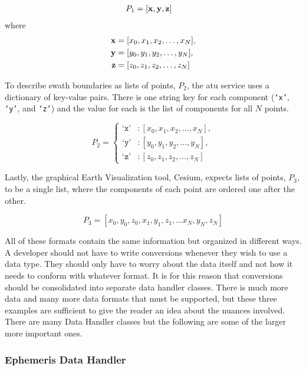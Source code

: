 \begin{align*}
    P_1 &= [\bm{\mathrm{x}}, \bm{\mathrm{y}}, \bm{\mathrm{z}}] 
\end{align*}
where
\begin{align*}
    \bm{\mathrm{x}} &= [x_0, x_1, x_2, \ldots, x_N],  \\
    \bm{\mathrm{y}} &= [y_0, y_1, y_2, \ldots, y_N],  \\
    \bm{\mathrm{z}} &= [z_0, z_1, z_2, \ldots, z_N]
\end{align*}

To describe swath boundaries as lists of points, $P_2$, the \gls{atu} service
uses a dictionary of key-value pairs. There is one string key for each
component (\texttt{`x'}, \texttt{`y'}, and \texttt{`z'}) and the value for each
is the list of components for all $N$ points. 

\begin{equation*}
    P_2 = 
    \left\{
    \begin{aligned}
	\texttt{`x'}&: [x_0, x_1, x_2, \ldots, x_N],  \\
	\texttt{`y'}&: [y_0, y_1, y_2, \ldots, y_N],  \\
	\texttt{`z'}&: [z_0, z_1, z_2, \ldots, z_N]
    \end{aligned}
    \right.
\end{equation*}

Lastly, the graphical Earth Visualization tool, Cesium, expects lists of
points, $P_3$, to be a single list, where the components of each point are
ordered one after the other.

\begin{equation*}
    P_3 = \left[ x_0, y_0, z_0, x_1, y_1, z_1, \ldots x_N, y_N, z_N \right]
\end{equation*}

All of these formats contain the same information but organized in different
ways.  A developer should not have to write conversions whenever they wish to
use a data type.  They should only have to worry about the data itself and not
how it needs to conform with whatever format. It is for this reason that
conversions should be consolidated into separate data handler classes.  There
is much more data and many more data formats that must be supported, but these
three examples are sufficient to give the reader an idea about the nuances
involved.  There are many Data Handler classes but the following are some of
the larger more important ones.


\subsubsection{Ephemeris Data Handler}

